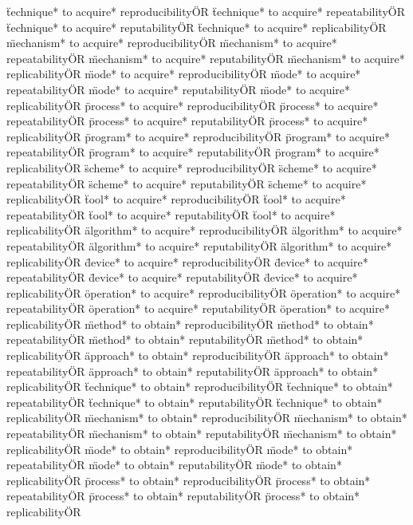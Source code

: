 \documentclass[
10pt, %
a4paper, %
oneside, %
headinclude,footinclude, %
BCOR5mm, %
]{scrartcl}
\begin{document}
\"technique* to acquire* reproducibility\" OR \"technique* to acquire* repeatability\" OR \"technique* to acquire* reputability\" OR \"technique* to acquire* replicability\" OR 
\"mechanism* to acquire* reproducibility\" OR \"mechanism* to acquire* repeatability\" OR \"mechanism* to acquire* reputability\" OR \"mechanism* to acquire* replicability\" OR 
\"mode* to acquire* reproducibility\" OR \"mode* to acquire* repeatability\" OR \"mode* to acquire* reputability\" OR \"mode* to acquire* replicability\" OR 
\"process* to acquire* reproducibility\" OR \"process* to acquire* repeatability\" OR \"process* to acquire* reputability\" OR \"process* to acquire* replicability\" OR 
\"program* to acquire* reproducibility\" OR \"program* to acquire* repeatability\" OR \"program* to acquire* reputability\" OR \"program* to acquire* replicability\" OR 
\"scheme* to acquire* reproducibility\" OR \"scheme* to acquire* repeatability\" OR \"scheme* to acquire* reputability\" OR \"scheme* to acquire* replicability\" OR 
\"tool* to acquire* reproducibility\" OR \"tool* to acquire* repeatability\" OR \"tool* to acquire* reputability\" OR \"tool* to acquire* replicability\" OR 
\"algorithm* to acquire* reproducibility\" OR \"algorithm* to acquire* repeatability\" OR \"algorithm* to acquire* reputability\" OR \"algorithm* to acquire* replicability\" OR 
\"device* to acquire* reproducibility\" OR \"device* to acquire* repeatability\" OR \"device* to acquire* reputability\" OR \"device* to acquire* replicability\" OR 
\"operation* to acquire* reproducibility\" OR \"operation* to acquire* repeatability\" OR \"operation* to acquire* reputability\" OR \"operation* to acquire* replicability\" OR 
\"method* to obtain* reproducibility\" OR \"method* to obtain* repeatability\" OR \"method* to obtain* reputability\" OR \"method* to obtain* replicability\" OR 
\"approach* to obtain* reproducibility\" OR \"approach* to obtain* repeatability\" OR \"approach* to obtain* reputability\" OR \"approach* to obtain* replicability\" OR 
\"technique* to obtain* reproducibility\" OR \"technique* to obtain* repeatability\" OR \"technique* to obtain* reputability\" OR \"technique* to obtain* replicability\" OR 
\"mechanism* to obtain* reproducibility\" OR \"mechanism* to obtain* repeatability\" OR \"mechanism* to obtain* reputability\" OR \"mechanism* to obtain* replicability\" OR 
\"mode* to obtain* reproducibility\" OR \"mode* to obtain* repeatability\" OR \"mode* to obtain* reputability\" OR \"mode* to obtain* replicability\" OR 
\"process* to obtain* reproducibility\" OR \"process* to obtain* repeatability\" OR \"process* to obtain* reputability\" OR \"process* to obtain* replicability\" OR 
\end{document}
